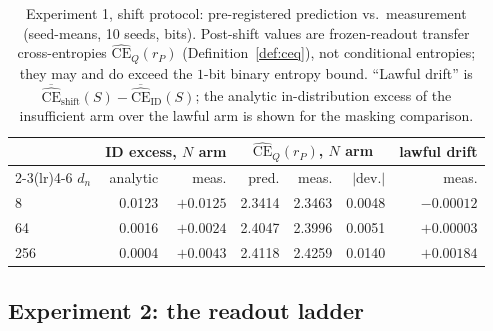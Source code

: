 \documentclass[twocolumn,10pt]{article}
\theoremstyle{definition}
\theoremstyle{remark}
\newcommand{\dn}{d_n}
\newcommand{\CE}{\mathrm{CE}}
\newcommand{\rP}{r_{P}}
\newcommand{\CEhat}{\widehat{\CE}}
\begin{document}
\begin{table}[t]
\centering
\caption{Experiment 1, shift protocol: pre-registered prediction vs.\
measurement (seed-means, 10 seeds, bits). Post-shift values are
frozen-readout transfer cross-entropies $\CEhat_Q(\rP)$
(Definition~\ref{def:ceq}), not conditional entropies; they may and do
exceed the $1$-bit binary entropy bound. ``Lawful drift'' is
$\overline{\CEhat}_{\mathrm{shift}}(S) - \overline{\CEhat}_{\mathrm{ID}}(S)$;
the analytic in-distribution excess of the insufficient arm over the lawful arm
is shown for the masking comparison.}
\label{tab:e1-shift}
\footnotesize
\setlength{\tabcolsep}{2.6pt}
\begin{tabular}{lrrrrrr}
\toprule
& \multicolumn{2}{c}{ID excess, $N$ arm} &
\multicolumn{3}{c}{$\CEhat_Q(\rP)$, $N$ arm} & lawful drift \\
\cmidrule(lr){2-3}\cmidrule(lr){4-6}
$\dn$ & analytic & meas. & pred. & meas. & $|$dev.$|$ & meas. \\
\midrule
8 & 0.0123 & $+0.0125$ & 2.3414 & 2.3463 & 0.0048 & $-0.00012$ \\
64 & 0.0016 & $+0.0024$ & 2.4047 & 2.3996 & 0.0051 & $+0.00003$ \\
256 & 0.0004 & $+0.0043$ & 2.4118 & 2.4259 & 0.0140 & $+0.00184$ \\
\bottomrule
\end{tabular}
\end{table}

\subsection{Experiment 2: the readout ladder}
\label{sec:exp2}
\end{document}
